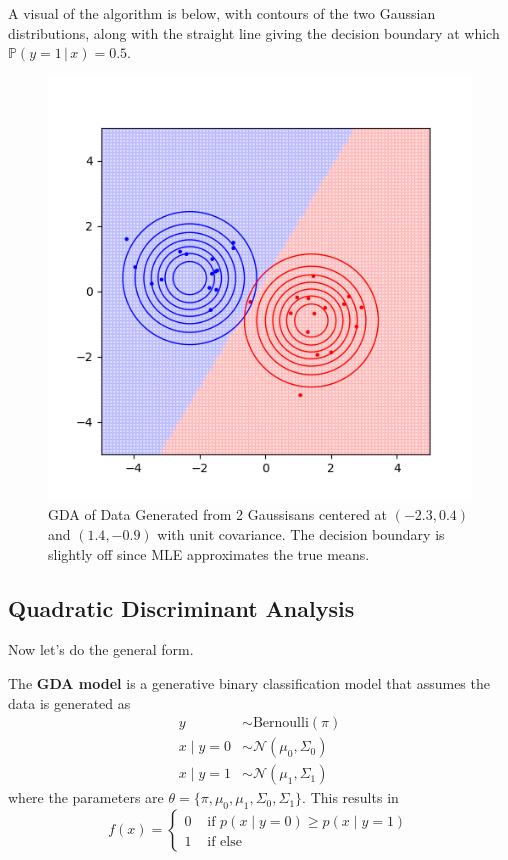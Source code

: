   A visual of the algorithm is below, with contours of the two Gaussian distributions, along with the straight line giving the decision boundary at which $\mathbb{P}(y=1\,|\,x) = 0.5$. 
  \begin{figure}[H]
    \centering
    \includegraphics[scale=0.7]{img/lda.png}
    \caption{GDA of Data Generated from 2 Gaussisans centered at $(-2.3, 0.4)$ and $(1.4, -0.9)$ with unit covariance. The decision boundary is slightly off since MLE approximates the true means. }
    \label{fig:lda}
  \end{figure}

\subsection{Quadratic Discriminant Analysis} 

  Now let's do the general form. 

  \begin{definition} 
    The \textbf{GDA model} is a generative binary classification model that assumes the data is generated as 
    \begin{align} 
      y & \sim \text{Bernoulli}(\pi) \\
      x \mid y = 0 & \sim \mathcal{N} (\mu_0, \Sigma_0) \\
      x \mid y = 1 & \sim \mathcal{N} (\mu_1, \Sigma_1)
    \end{align}
    where the parameters are $\theta = \{\pi, \mu_0, \mu_1, \Sigma_0, \Sigma_1\}$. This results in 
    \begin{equation}
      f(x) = \begin{cases} 
        0 & \text{ if } p(x \mid y = 0) \geq p(x \mid y = 1) \\  
        1 & \text{ if else}
      \end{cases}
    \end{equation}
  \end{definition} 

